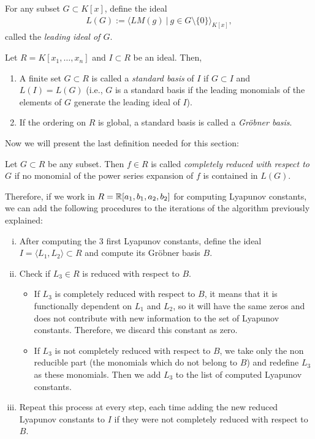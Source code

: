\begin{definicio}
\label{def.lideal}
For any subset $G\subset K[x]$, define the ideal
\begin{align*}
L(G):=\langle LM(g)~|~g\in G\setminus\{0\}\rangle_{K[x]},
\end{align*}
called the \emph{leading ideal of $G$}.
\end{definicio}

\begin{definicio}
Let $R=K[x_1,\dots,x_n]$ and $I\subset R$ be an ideal. Then,
\begin{enumerate}
\item
A finite set $G\subset R$ is called a \emph{standard basis} of $I$ if $G\subset I$ and $L(I)=L(G)$ (i.e., $G$ is a standard basis if the leading monomials of the elements of $G$ generate the leading ideal of $I$).
\item
If the ordering on $R$ is global, a standard basis is called a \emph{Gröbner basis}.
\end{enumerate}
\end{definicio}

Now we will present the last definition needed for this section:
\begin{definicio}
Let $G\subset R$ be any subset. Then $f\in R$ is called \emph{completely reduced with respect to $G$} if no monomial of the power series expansion of $f$ is contained in $L(G)$.
\end{definicio}

Therefore, if we work in $R=\mathbb{R}[a_1,b_1,a_2,b_2]$ for computing Lyapunov constants, we can add the following procedures to the iterations of the algorithm previously explained:
\begin{enumerate}[(i)]
\item
After computing the 3 first Lyapunov constants, define the ideal $I=\langle L_1,L_2\rangle\subset R$ and compute its Gröbner basis $B$.
\item
Check if $L_3\in R$ is reduced with respect to $B$.
\begin{itemize}
\item
If $L_3$ is completely reduced with respect to $B$, it means that it is functionally dependent on $L_1$ and $L_2$, so it will have the same zeros and does not contribute with new information to the set of Lyapunov constants. Therefore, we discard this constant as zero.
\item
If $L_3$ is not completely reduced with respect to $B$, we take only the non reducible part (the monomials which do not belong to $B$) and redefine $L_3$ as these monomials. Then we add $L_3$ to the list of computed Lyapunov constants.
\end{itemize}
\item
Repeat this process at every step, each time adding the new reduced Lyapunov constants to $I$ if they were not completely reduced with respect to $B$.
\end{enumerate}

